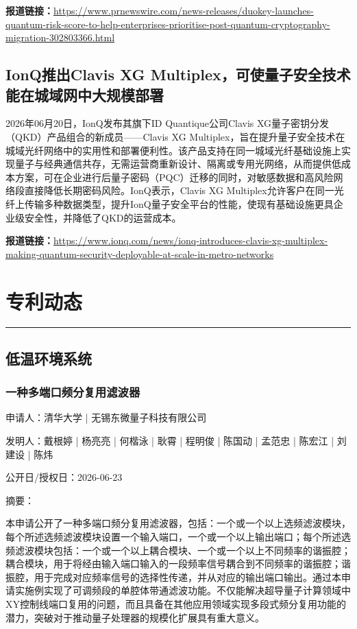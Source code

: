 \documentclass[12pt,a4paper]{ctexart}
\begin{document}
\noindent\textbf{报道链接：}\url{https://www.prnewswire.com/news-releases/duokey-launches-quantum-risk-score-to-help-enterprises-prioritise-post-quantum-cryptography-migration-302803366.html}

\subsection{ IonQ推出Clavis XG Multiplex，可使量子安全技术能在城域网中大规模部署 }

2026年06月20日，IonQ发布其旗下ID Quantique公司Clavis XG量子密钥分发（QKD）产品组合的新成员——Clavis XG Multiplex，旨在提升量子安全技术在城域光纤网络中的实用性和部署便利性。该产品支持在同一城域光纤基础设施上实现量子与经典通信共存，无需运营商重新设计、隔离或专用光网络，从而提供低成本方案，可在企业进行后量子密码（PQC）迁移的同时，对敏感数据和高风险网络段直接降低长期密码风险。IonQ表示，Clavis XG Multiplex允许客户在同一光纤上传输多种数据类型，提升IonQ量子安全平台的性能，使现有基础设施更具企业级安全性，并降低了QKD的运营成本。

\noindent\textbf{报道链接：}\url{https://www.ionq.com/news/ionq-introduces-clavis-xg-multiplex-making-quantum-security-deployable-at-scale-in-metro-networks}



\newpage
\section{专利动态}
\vspace{-0.5em}
\noindent\rule{\linewidth}{1.5pt}

\subsection{ 低温环境系统 }

\subsubsection{ 一种多端口频分复用滤波器 }

申请人：清华大学 | 无锡东微量子科技有限公司

发明人：戴根婷 | 杨亮亮 | 何楷泳 | 耿霄 | 程明俊 | 陈国动 | 孟范忠 | 陈宏江 | 刘建设 | 陈炜

公开日/授权日：2026-06-23

摘要：

本申请公开了一种多端口频分复用滤波器，包括：一个或一个以上选频滤波模块，每个所述选频滤波模块设置一个输入端口，一个或一个以上输出端口；每个所述选频滤波模块包括：一个或一个以上耦合模块、一个或一个以上不同频率的谐振腔；耦合模块，用于将经由输入端口输入的一段频率信号耦合到不同频率的谐振腔；谐振腔，用于完成对应频率信号的选择性传递，并从对应的输出端口输出。通过本申请实施例实现了可调频段的单腔体带通滤波功能。不仅能解决超导量子计算领域中XY控制线端口复用的问题，而且具备在其他应用领域实现多段式频分复用功能的潜力，突破对于推动量子处理器的规模化扩展具有重大意义。
\end{document}
